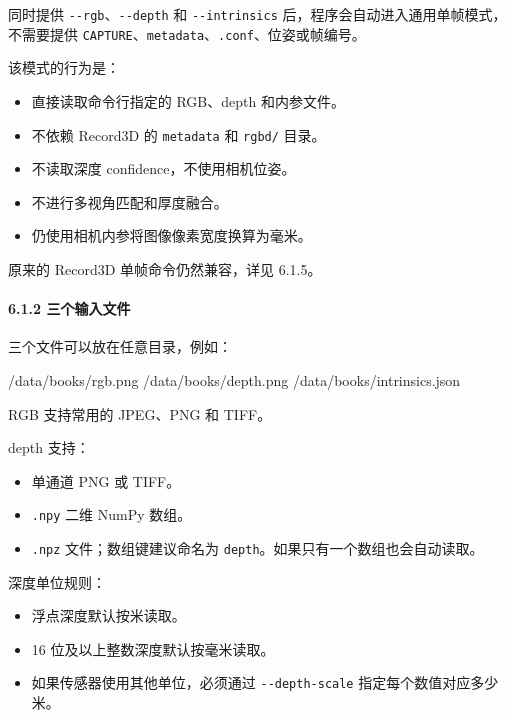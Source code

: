 \documentclass[
  chinese,
  11pt,
  a4paper,
]{article}
\newenvironment{Shaded}{\begin{snugshade}}{\end{snugshade}}
\newcommand{\NormalTok}[1]{#1}
\providecommand{\tightlist}{%
  \setlength{\itemsep}{0pt}\setlength{\parskip}{0pt}}
\begin{document}
同时提供 \texttt{-\/-rgb}、\texttt{-\/-depth} 和 \texttt{-\/-intrinsics}
后，程序会自动进入通用单帧模式， 不需要提供
\texttt{CAPTURE}、\texttt{metadata}、\texttt{.conf}、位姿或帧编号。

该模式的行为是：

\begin{itemize}
\tightlist
\item
  直接读取命令行指定的 RGB、depth 和内参文件。
\item
  不依赖 Record3D 的 \texttt{metadata} 和 \texttt{rgbd/} 目录。
\item
  不读取深度 confidence，不使用相机位姿。
\item
  不进行多视角匹配和厚度融合。
\item
  仍使用相机内参将图像像素宽度换算为毫米。
\end{itemize}

原来的 Record3D 单帧命令仍然兼容，详见 6.1.5。

\paragraph{6.1.2
三个输入文件}\label{612-ux4e09ux4e2aux8f93ux5165ux6587ux4ef6}

三个文件可以放在任意目录，例如：

\begin{Shaded}
\begin{Highlighting}[]
\NormalTok{/data/books/rgb.png}
\NormalTok{/data/books/depth.png}
\NormalTok{/data/books/intrinsics.json}
\end{Highlighting}
\end{Shaded}

RGB 支持常用的 JPEG、PNG 和 TIFF。

depth 支持：

\begin{itemize}
\tightlist
\item
  单通道 PNG 或 TIFF。
\item
  \texttt{.npy} 二维 NumPy 数组。
\item
  \texttt{.npz} 文件；数组键建议命名为
  \texttt{depth}。如果只有一个数组也会自动读取。
\end{itemize}

深度单位规则：

\begin{itemize}
\tightlist
\item
  浮点深度默认按米读取。
\item
  16 位及以上整数深度默认按毫米读取。
\item
  如果传感器使用其他单位，必须通过 \texttt{-\/-depth-scale}
  指定每个数值对应多少米。
\end{itemize}
\end{document}
